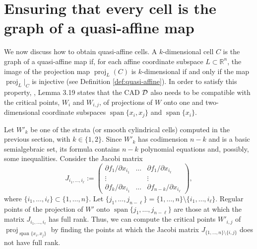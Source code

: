 \documentclass[
]{book}
\theoremstyle{definition}
\theoremstyle{definition}
\theoremstyle{definition}
\theoremstyle{definition}
\theoremstyle{remark}
\begin{document}
\hypertarget{ensuring-that-every-cell-is-the-graph-of-a-quasi-affine-map}{%
\section{Ensuring that every cell is the graph of a quasi-affine map}\label{ensuring-that-every-cell-is-the-graph-of-a-quasi-affine-map}}

We now discuss how to obtain quasi-affine cells. A \(k\)-dimensional cell \(C\) is the graph of a quasi-affine map if, for each affine coordinate subspace \(L \subset \mathbb{R}^n\), the image of the projection map \(\operatorname{proj}_{L}(C)\) is \(k\)-dimensional if and only if the map \(\operatorname{proj}_{L}\vert_C\) is injective (see Definition \ref{def:quasi-affine}).
In order to satisfy this property, \citet{bgv15}, Lemma 3.19 states that the CAD \(\cal D\) also needs to be compatible with the critical points, \(W_{i}\) and \(W_{i,j}\), of projections of \(W\) onto one and two-dimensional coordinate subspaces \({\operatorname{span} \{x_i,x_j\}}\) and \({\operatorname{span} \{x_i\}}\).

Let \(W'_k\) be one of the strata (or smooth cylindrical cells) computed in the previous section, with \(k\in \{1,2\}\). Since \(W'_k\) has codimension \(n-k\) and is a basic semialgebraic set, its formula contains \(n-k\) polynomial equations and, possibly, some inequalities.
Consider the Jacobi matrix
\[
J_{i_1,\ldots,i_\ell}:=\begin{pmatrix}\partial f_{1}/\partial x_{i_{1}} & \ldots & \partial f_{1}/\partial x_{i_{\ell}}\\
\vdots &  & \vdots\\
\partial f_{k}/\partial x_{i_{1}} & \ldots & \partial f_{n-k}/\partial x_{i_{\ell}}
\end{pmatrix},
\]
where \(\{i_1,\ldots,i_\ell\} \subset \{ 1, \ldots, n \}\). Let \(\{j_1,\ldots,j_{n-\ell}\} = \{ 1 , \ldots, n \} \setminus \{ i_1,\ldots,i_\ell \}\).
Regular points of the projection of \(W'\) onto \({\operatorname{span} \{j_1,\ldots,j_{n - \ell}\}}\) are those at which the matrix \(J_{i_1,\ldots,i_\ell}\) has full rank.
Thus, we can compute the critical points \(W'_{i,j}\) of \({\operatorname{proj}_{{\operatorname{span} \{x_i,x_j\}}}}\) by finding the points at which the Jacobi matrix \(J_{\{1,\ldots,n\} \setminus \{i,j\}}\) does not have full rank.
\end{document}
